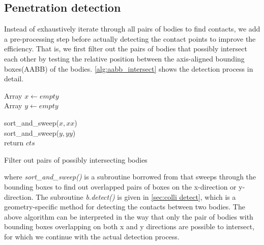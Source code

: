 \subsection{Penetration detection}
Instead of exhaustively iterate through all pairs of bodies to find contacts, we add a pre-processing step before actually detecting the contact points to improve the efficiency. That is, we first filter out the pairs of bodies that possibly intersect each other by testing the relative position between the axis-aligned bounding boxes(AABB) of the bodies. \autoref{alg:aabb_intersect} shows the detection process in detail.

\begin{algorithm}[htbp]
    \SetAlgoLined
    
    Array $x \leftarrow empty$ \\
    Array $y \leftarrow empty$ \\
    
    
    sort\_and\_sweep($x, xx$) \\
    sort\_and\_sweep($y, yy$) \\
    
    return $cts$
    \caption{Filter out pairs of possibly intersecting bodies}
    \label{alg:aabb_intersect}
\end{algorithm}
where \emph{sort\_and\_sweep()} is a subroutine borrowed from \cite{coursenote} that sweeps through the bounding boxes to find out overlapped pairs of boxes on the x-direction or y-direction. The subroutine \emph{b.detect()} is given in \autoref{sec:colli detect}, which is a geometry-specific method for detecting the contacts between two bodies.
The above algorithm can be interpreted in the way that only the pair of bodies with bounding boxes overlapping on both x and y directions are possible to intersect, for which we continue with the actual detection process.
